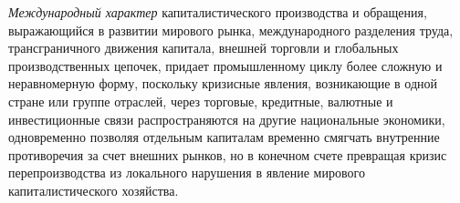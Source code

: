 \textit{Международный характер} капиталистического производства и обращения, выражающийся в развитии мирового рынка, международного разделения труда, трансграничного движения капитала, внешней торговли и глобальных производственных цепочек, придает промышленному циклу более сложную и неравномерную форму, поскольку кризисные явления, возникающие в одной стране или группе отраслей, через торговые, кредитные, валютные и инвестиционные связи распространяются на другие национальные экономики, одновременно позволяя отдельным капиталам временно смягчать внутренние противоречия за счет внешних рынков, но в конечном счете превращая кризис перепроизводства из локального нарушения в явление мирового капиталистического хозяйства.